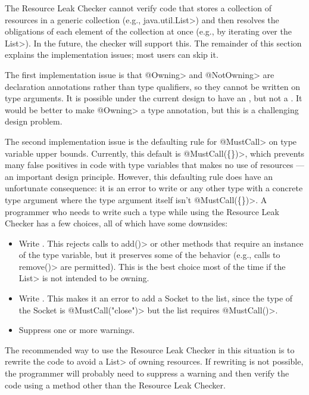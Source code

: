 
The Resource Leak Checker cannot verify code that stores a collection of
resources in a generic collection (e.g., \<java.util.List>) and then
resolves the obligations of each element of the collection at once (e.g.,
by iterating over the \<List>).  In the future, the checker will support
this.  The remainder of this section explains the implementation issues;
most users can skip it.

The first implementation issue is that \<@Owning> and \<@NotOwning> are
declaration annotations rather than type qualifiers, so they cannot be
written on type arguments. It is possible under the current design to have
an , but not a .
It would be better to make \<@Owning> a type annotation, but this is a
challenging design problem.

The second implementation issue is the defaulting rule for \<@MustCall> on
type variable upper bounds.  Currently, this default is \<@MustCall(\{\})>,
which prevents many false positives in code with type variables that makes
no use of resources --- an important design principle.
However, this defaulting rule does have an unfortunate consequence: it is
an error to write  or any other type with a concrete
type argument where the type argument itself isn't \<@MustCall(\{\})>. A programmer who
needs to write such a type while using the Resource Leak Checker has a few
choices, all of which have some downsides:

\begin{itemize}
\item Write . This rejects calls to \<add()>
or other methods that require an instance of the type variable, but it
preserves some of the behavior (e.g., calls to \<remove()> are permitted).
This is the best choice most of the time if the \<List> is not intended to
be owning.
\item Write . This makes it an error to
add a Socket to the list, since the type of the Socket is
\<@MustCall("close")> but the list requires \<@MustCall()>.
\item Suppress one or more warnings.
\end{itemize}

The recommended way to use the Resource Leak Checker in this situation is
to rewrite the code to avoid a \<List> of owning resources. If rewriting is
not possible, the programmer will probably need to suppress a warning and
then verify the code using a method other than the Resource Leak Checker.


